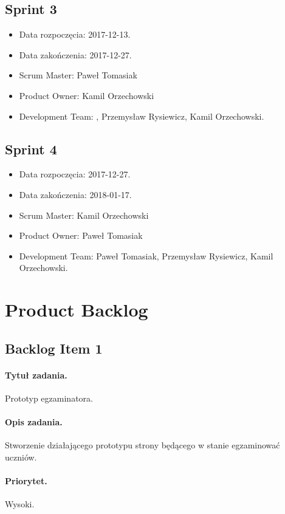 \documentclass[a4paper]{article}
\begin{document}
\subsection{Sprint 3}

\begin{itemize}
\item Data rozpoczęcia: 2017-12-13.
\item  Data zakończenia: 2017-12-27.
\item Scrum Master: Paweł Tomasiak
\item Product Owner: Kamil Orzechowski
\item Development Team: , Przemysław Rysiewicz, Kamil Orzechowski.
\end{itemize}

\subsection{Sprint 4}

\begin{itemize}
\item Data rozpoczęcia: 2017-12-27.
\item  Data zakończenia: 2018-01-17.
\item Scrum Master: Kamil Orzechowski
\item Product Owner: Paweł Tomasiak
\item Development Team: Paweł Tomasiak, Przemysław Rysiewicz, Kamil Orzechowski.
\end{itemize}


\section{Product Backlog}

\subsection{Backlog Item 1}
\paragraph{Tytuł zadania.} Prototyp egzaminatora.
\paragraph{Opis zadania.} Stworzenie działającego prototypu strony będącego w stanie egzaminować uczniów.
\paragraph{Priorytet.} Wysoki.
\end{document}
